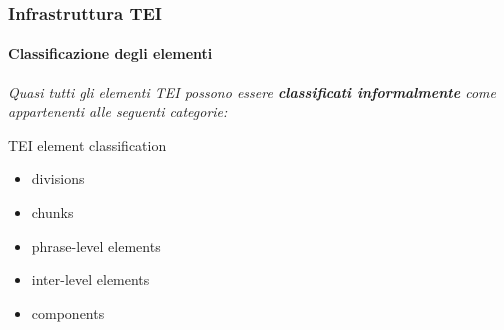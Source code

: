 







% 


\begin{frame}
    \frametitle{Infrastruttura TEI}
    \framesubtitle{Classificazione degli elementi}
    \addtocounter{nframe}{1}
    \textit{Quasi tutti gli elementi TEI possono essere \textbf{classificati informalmente} come appartenenti alle seguenti categorie:}
    \begin{block}{TEI element classification}
        \begin{itemize}
            \item divisions
            \item chunks
            \item phrase-level elements
            \item inter-level elements
            \item components
        \end{itemize}

    \end{block}

\end{frame}

